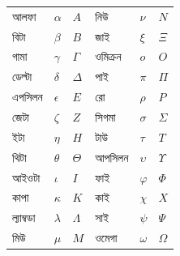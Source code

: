 \documentclass[../../../include/open-logic-chapter]{subfiles}
\begin{document}

\begin{center}
    \begin{tabular}{lll@{\qquad}lll}
    আলফা & $\alpha$ & $A$ &
    নিউ & $\nu$ & $N$ \\
    বিটা & $\beta$ & $B$ &
    জাই & $\xi$ & $\Xi$ \\
    গামা & $\gamma$ & $\Gamma$ &
    ওমিক্রন & $o$ & $O$ \\
    ডেল্টা & $\delta$ & $\Delta$ &
    পাই & $\pi$ & $\Pi$ \\
    এপসিলন & $\epsilon$ & $E$ &
    রো & $\rho$ & $P$ \\
    জেটা & $\zeta$ & $Z$ &
    সিগমা & $\sigma$ & $\Sigma$ \\
    ইটা & $\eta$ & $H$ &
    টাউ & $\tau$ & $T$ \\
    থিটা & $\theta$ & $\Theta$ &
    আপসিলন & $\upsilon$ & $\Upsilon$ \\
    আইওটা & $\iota$ & $I$ &
    ফাই & $\varphi$ & $\Phi$ \\
    কাপা & $\kappa$ & $K$ &
    কাই & $\chi$ & $X$ \\
    ল্যাম্বডা & $\lambda$ & $\Lambda$ &
    সাই & $\psi$ & $\Psi$ \\
    মিউ & $\mu$ & $M$ &
    ওমেগা & $\omega$ & $\Omega$
    \end{tabular}
\end{center}
\end{document}

